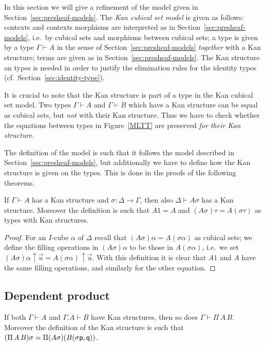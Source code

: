 \documentclass[a4paper,USenglish,draft]{lipics}
\newcommand{\pp}{{\sf p}}
\newcommand{\qq}{{\sf q}}
\newcommand{\rup}[1]{#1{\uparrow}}
\begin{document}
In this section we will give a refinement of the model given in
Section~\ref{sec:presheaf-models}.  The \emph{Kan cubical set model}
is given as follows: contexts and contexts morphisms are interpreted
as in Section~\ref{sec:presheaf-models}, i.e.\ by cubical sets and
morphisms between cubical sets; a type is given by a type $\Gamma
\vdash A$ in the sense of Section~\ref{sec:presheaf-models}
\emph{together} with a Kan structure; terms are given as in
Section~\ref{sec:presheaf-models}. The Kan structure on types is
needed in order to justify the elimination rules for the identity
types (cf.\ Section~\ref{sec:identity-type}).

It is crucial to note that the Kan structure is part of a type in the
Kan cubical set model.  Two types $\Gamma \vdash A$ and $\Gamma \vdash
B$ which have a Kan structure can be equal as cubical sets, but
\emph{not} with their Kan structure.  Thus we have to check whether
the equations between types in Figure~\ref{MLTT} are preserved
\emph{for their Kan structure}.

The definition of the model is such that it follows the model
described in Section~\ref{sec:presheaf-models}, but additionally we
have to define how the Kan structure is given on the types.  This is
done in the proofs of the following theorems.

\begin{theorem}
  If $\Gamma \vdash A$ has a Kan structure and $\sigma \colon \Delta
  \to \Gamma$, then also $\Delta \vdash A \sigma$ has a Kan structure.
  Moreover the definition is such that $A 1 = A$ and $(A \sigma) \tau
  = A (\sigma \tau)$ as types with Kan structures.
\end{theorem}
\begin{proof}
  For an $I$-cube $\alpha$ of $\Delta$ recall that $(A \sigma) \alpha
  = A (\sigma \alpha)$ as cubical sets; we define the filling
  operations in $(A \sigma) \alpha$ to be those in $A (\sigma
  \alpha)$, i.e.\ we set $\rup{(A \sigma) \alpha} {\vec u} = \rup {A
    (\sigma \alpha)} {\vec u}$.  With this definition it is clear that
  $A 1$ and $A$ have the same filling operations, and similarly for
  the other equation.
\end{proof}

\subsection{Dependent product}

\begin{theorem}
  If both $\Gamma\vdash A$ and $\Gamma.A\vdash B$ have Kan structures,
  then so does $\Gamma\vdash\Pi\,A\,B$.  Moreover the definition of
  the Kan structure is such that $(\Pi\,A\,B) \sigma = \Pi (A \sigma)
  (B (\sigma \pp, \qq))$.
\end{theorem}
\end{document}
